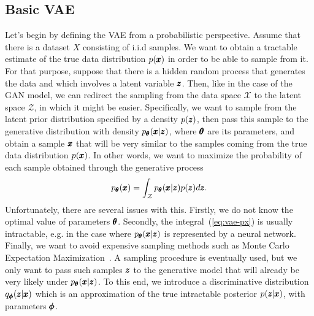 \subsection{Basic VAE} \label{sec:vanilla_vae}
Let's begin by defining the VAE from a probabilistic perspective. Assume that there is a dataset $X$ consisting of i.i.d samples. We want to obtain a tractable estimate of the true data distribution $p(\pmb{{x}})$ in order to be able to sample from it. For that purpose, suppose that there is a hidden random process that generates the data and which involves a latent variable $\pmb{{z}}$. Then, like in the case of the GAN model, we can redirect the sampling from the data space $\mathcal{X}$ to the latent space
$\mathcal{Z}$, in which it might be easier. Specifically, we want to sample from the latent prior distribution specified by a density $p(\pmb{{z}})$, then pass this sample to the generative distribution with density $p_{\pmb{{\theta}}}(\pmb{{x}}|\pmb{{z}})$, where $\pmb{{\theta}}$ are its parameters, and obtain a sample $\pmb{{x}}$ that will be very similar to the samples coming from the true data distribution $p(\pmb{{x}})$. In other words, we want to maximize the probability of each sample obtained through the generative process
\begin{equation} \label{eq:vae-px}
p_{\pmb{{\theta}}}(\pmb{{x}})=\int_{\mathcal{Z}}p_{\pmb{{\theta}}}(\pmb{{x}}|\pmb{{z}})p(\pmb{{z}})d\pmb{{z}}.
\end{equation}
Unfortunately, there are several issues with this. Firstly, we do not know the optimal value of parameters $\pmb{{\theta}}$. Secondly, the integral~(\ref{eq:vae-px}) is usually intractable, e.g. in the case where $p_{\pmb{{\theta}}}(\pmb{{x}}|\pmb{{z}})$ is represented by a neural network. Finally, we want to avoid expensive sampling methods such as Monte Carlo Expectation Maximization~\cite{levine2001implementations}. A sampling procedure is eventually used, but we only want to pass such samples $\pmb{{z}}$ to the generative model that will already be very likely under $p_{\pmb{{\theta}}}(\pmb{{x}}|\pmb{{z}})$. To this end, we introduce a discriminative distribution $q_{\pmb{{\phi}}}(\pmb{{z}}|\pmb{{x}})$ which is an approximation of the true intractable posterior $p(\pmb{{z}}|\pmb{{x}})$, with parameters $\pmb{{\phi}}$.

